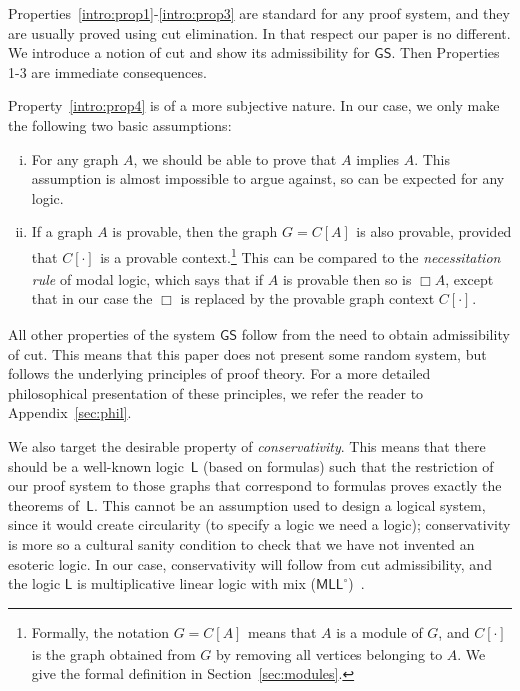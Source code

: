\documentclass{lmcs} %
\def\L{\mathsf{L}}
\def\lbox{\Box}
\def\GS{\mathsf{GS}}
\newcommand{\coons}[2]{[#1]_{#2}}														%
\newcommand{\coonso}[1]{[\cdot]_{#1}}
\def\MLLm{\mathsf{MLL^\circ}}
\theoremstyle{plain}
\begin{document}
Properties~\ref{intro:prop1}-\ref{intro:prop3} are standard for any proof system, and they are usually
proved using cut elimination. In that respect our paper is no
different. We introduce a notion of cut and show its
admissibility for $\GS$. Then Properties 1-3 are immediate consequences.

Property~\ref{intro:prop4} is of a more subjective nature. In our case, we only make
the following two basic assumptions:


\begin{enumerate}[(i)]
	\item 
	For any graph $A$, we should be able to prove that $A$
	  implies $A$. 
	  This assumption is almost impossible to argue against, so can be expected for any logic.
	  
	\item
	If a graph $A$ is provable, then the graph $G=C\coons{A}{}$ 
		is  also provable, provided that
	  $C\coonso{}$ is a provable context.\footnote{Formally, the notation $G=C\coons{A}{}$ means that
	    $A$ is a module of $G$, and $C\coonso{}$ is the graph obtained
	    from $G$ by removing all vertices belonging to $A$. We give the
	    formal definition in Section~\ref{sec:modules}.} This can be compared to the
	  \emph{necessitation rule} of modal logic, which says that if $A$ is
	  provable then so is $\lbox A$, except that in our case the $\lbox$
	  is replaced by the provable graph context $C\coonso{}$.
\end{enumerate}


All other properties of the system $\GS$ follow from the need to
obtain admissibility of cut. This means that this paper does not
present some random system, but follows the underlying principles of
proof theory.
%
For a more detailed philosophical presentation of these principles, we refer the reader to Appendix~\ref{sec:phil}.



We also target the desirable property of \emph{conservativity}. 
This means that there should be a well-known logic~$\L$
  (based on formulas) such that the restriction of our proof system to
  those graphs that correspond to formulas proves exactly the
  theorems of~$\L$.
This cannot be an assumption used to design a logical system, since it would create circularity (to specify a logic we need a logic); conservativity is more so a cultural sanity condition to check that we have not invented an esoteric logic.
In our case, conservativity will follow from cut admissibility, and 
the logic $\L$ is multiplicative linear logic with mix ($\MLLm$)~\cite{girard:87,bellin:mix,fleury:retore:94}.
\end{document}
